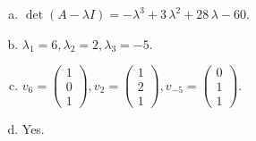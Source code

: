 \begin{questions}
\begin{solution}
\begin{enumerate}[(a)]
\item $\det(A-\lambda I)=-{\lambda}^{3} + 3 \, {\lambda}^{2} + 28 \, {\lambda} - 60$.
\item ${\lambda}_1=6, {\lambda}_2=2, {\lambda}_3=-5$.
\item $v_{6}=\left(\begin{array}{r}
1 \\
0 \\
1
\end{array}\right), v_{2}=\left(\begin{array}{r}
1 \\
2 \\
1
\end{array}\right), v_{-5}=\left(\begin{array}{r}
0 \\
1 \\
1
\end{array}\right)$.
\item Yes.
\end{enumerate}
\end{solution}

\end{questions}

\newpage


\begin{center}
\end{center}


